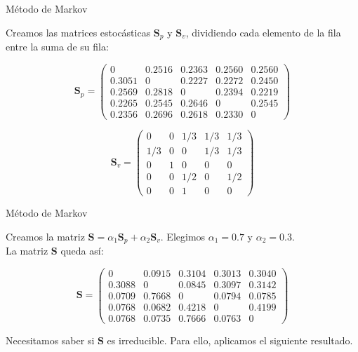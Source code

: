 \documentclass[10pt,hyperref={unicode}]{beamer}
\begin{document}
	\begin{frame}{Método de Markov}
		\begin{ejemplo}[continuación]
			Creamos las matrices estocásticas $\mathbf{S}_p$ y $\mathbf{S}_v$, dividiendo cada elemento de la fila entre la suma de su fila:
			
			\[ \mathbf{S}_p = \left(\begin{array}{rrrrr}
			0      & 0.2516 & 0.2363 & 0.2560 & 0.2560 \\
			0.3051 & 0      & 0.2227 & 0.2272 & 0.2450 \\
			0.2569 & 0.2818 & 0      & 0.2394 & 0.2219 \\
			0.2265 & 0.2545 & 0.2646 & 0      & 0.2545 \\
			0.2356 & 0.2696 & 0.2618 & 0.2330 & 0
			\end{array}\right) \] 
			
			\[ \mathbf{S}_v = \left(\begin{array}{rrrrr}
			0     & 0   & 1/3 & 1/3 & 1/3\\
			1/3   & 0   & 0   & 1/3 & 1/3\\
			0     & 1   & 0   & 0   & 0  \\
			0     & 0   & 1/2 & 0   & 1/2\\
			0     & 0   & 1   & 0   & 0
			\end{array}\right) \]
			
			
		\end{ejemplo}
	\end{frame}
	
	\begin{frame}{Método de Markov}
		\begin{ejemplo}[continuación]
		Creamos la matriz $\mathbf{S} = \alpha_1 \mathbf{S}_p + \alpha_2 \mathbf{S}_v$. Elegimos $\alpha_1 = 0.7$ y $\alpha_2 = 0.3$.\\
		
		La matriz $\mathbf{S}$ queda así:
		
		\[ \mathbf{S} = \left(\begin{array}{rrrrr}
		0      & 0.0915 & 0.3104 & 0.3013 & 0.3040 \\
		0.3088 & 0      & 0.0845 & 0.3097 & 0.3142 \\
		0.0709 & 0.7668 & 0      & 0.0794 & 0.0785 \\
		0.0768 & 0.0682 & 0.4218 & 0      & 0.4199 \\
		0.0768 & 0.0735 & 0.7666 & 0.0763 & 0
		
		\end{array}\right) \]
		
		Necesitamos saber si $\mathbf{S}$ es irreducible. Para ello, aplicamos el siguiente resultado.
		\end{ejemplo}
	\end{frame}
	
\end{document}
